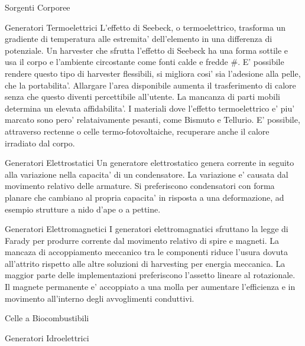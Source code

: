 \begin{multicols}{2}
\begin{section}{Sorgenti Corporee}
   \begin{subsection}{Generatori Termoelettrici}
    L'effetto di Seebeck, o termoelettrico, trasforma un gradiente di temperatura alle estremita' dell'elemento in una differenza di potenziale. Un harvester che sfrutta l'effetto di Seebeck ha una forma sottile e usa il corpo e l'ambiente circostante come fonti calde e fredde \#. E' possibile rendere questo tipo di harvester flessibili, si migliora cosi' sia l'adesione alla pelle, che la portabilita'. Allargare l'area disponibile aumenta il trasferimento di calore senza che questo diventi percettibile all'utente. La mancanza di parti mobili determina un elevata affidabilita'. I materiali dove l'effetto termoelettrico e' piu' marcato sono pero' relataivamente pesanti, come Bismuto e Tellurio. E' possibile, attraverso rectenne o celle termo-fotovoltaiche, recuperare anche il calore irradiato dal corpo.
   \end{subsection}

   \begin{subsection}{Generatori Elettrostatici}
    Un generatore elettrostatico genera corrente in seguito alla variazione nella capacita' di un condensatore. La variazione e' causata dal movimento relativo delle armature. Si preferiscono condensatori con forma planare che cambiano al propria capacita' in risposta a una deformazione, ad esempio strutture a nido d'ape o a pettine.
   \end{subsection}

   \begin{subsection}{Generatori Elettromagnetici}
    I generatori elettromagnatici sfruttano la legge di Farady per produrre corrente dal movimento relativo di spire e magneti. La mancaza di accoppiamento meccanico tra le componenti riduce l'usura dovuta all'attrito rispetto alle altre soluzioni di harvesting per energia meccanica. La maggior parte delle implementazioni preferiscono l'assetto lineare al rotazionale. Il magnete permanente e' accoppiato a una molla per aumentare l'efficienza e in movimento all'interno degli avvoglimenti conduttivi. \cite{aliRecentProgressEnergy2023}
   \end{subsection}
   
   \begin{subsection}{Celle a Biocombustibili}
    
   \end{subsection}

   \begin{subsection}{Generatori Idroelettrici}
    

\end{subsection}
\end{section}
\end{multicols}

